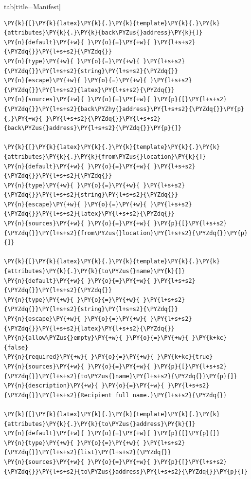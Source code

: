 \documentclass[a4paper,twoside]{article}
\begin{document}
\begin{tsdiv}{tab}[title=Manifest]
\begin{tscode}[lang=toml, engine=pygments]
\begin{Verbatim}[commandchars=\\\{\},breaklines, breakanywhere, commandchars=\\\{\}]
\PY{k}{[}\PY{k}{latex}\PY{k}{.}\PY{k}{template}\PY{k}{.}\PY{k}{attributes}\PY{k}{.}\PY{k}{back\PYZus{}address}\PY{k}{]}
\PY{n}{default}\PY{+w}{ }\PY{o}{=}\PY{+w}{ }\PY{l+s+s2}{\PYZdq{}}\PY{l+s+s2}{\PYZdq{}}
\PY{n}{type}\PY{+w}{ }\PY{o}{=}\PY{+w}{ }\PY{l+s+s2}{\PYZdq{}}\PY{l+s+s2}{string}\PY{l+s+s2}{\PYZdq{}}
\PY{n}{escape}\PY{+w}{ }\PY{o}{=}\PY{+w}{ }\PY{l+s+s2}{\PYZdq{}}\PY{l+s+s2}{latex}\PY{l+s+s2}{\PYZdq{}}
\PY{n}{sources}\PY{+w}{ }\PY{o}{=}\PY{+w}{ }\PY{p}{[}\PY{l+s+s2}{\PYZdq{}}\PY{l+s+s2}{back\PYZhy{}address}\PY{l+s+s2}{\PYZdq{}}\PY{p}{,}\PY{+w}{ }\PY{l+s+s2}{\PYZdq{}}\PY{l+s+s2}{back\PYZus{}address}\PY{l+s+s2}{\PYZdq{}}\PY{p}{]}

\PY{k}{[}\PY{k}{latex}\PY{k}{.}\PY{k}{template}\PY{k}{.}\PY{k}{attributes}\PY{k}{.}\PY{k}{from\PYZus{}location}\PY{k}{]}
\PY{n}{default}\PY{+w}{ }\PY{o}{=}\PY{+w}{ }\PY{l+s+s2}{\PYZdq{}}\PY{l+s+s2}{\PYZdq{}}
\PY{n}{type}\PY{+w}{ }\PY{o}{=}\PY{+w}{ }\PY{l+s+s2}{\PYZdq{}}\PY{l+s+s2}{string}\PY{l+s+s2}{\PYZdq{}}
\PY{n}{escape}\PY{+w}{ }\PY{o}{=}\PY{+w}{ }\PY{l+s+s2}{\PYZdq{}}\PY{l+s+s2}{latex}\PY{l+s+s2}{\PYZdq{}}
\PY{n}{sources}\PY{+w}{ }\PY{o}{=}\PY{+w}{ }\PY{p}{[}\PY{l+s+s2}{\PYZdq{}}\PY{l+s+s2}{from\PYZus{}location}\PY{l+s+s2}{\PYZdq{}}\PY{p}{]}

\PY{k}{[}\PY{k}{latex}\PY{k}{.}\PY{k}{template}\PY{k}{.}\PY{k}{attributes}\PY{k}{.}\PY{k}{to\PYZus{}name}\PY{k}{]}
\PY{n}{default}\PY{+w}{ }\PY{o}{=}\PY{+w}{ }\PY{l+s+s2}{\PYZdq{}}\PY{l+s+s2}{\PYZdq{}}
\PY{n}{type}\PY{+w}{ }\PY{o}{=}\PY{+w}{ }\PY{l+s+s2}{\PYZdq{}}\PY{l+s+s2}{string}\PY{l+s+s2}{\PYZdq{}}
\PY{n}{escape}\PY{+w}{ }\PY{o}{=}\PY{+w}{ }\PY{l+s+s2}{\PYZdq{}}\PY{l+s+s2}{latex}\PY{l+s+s2}{\PYZdq{}}
\PY{n}{allow\PYZus{}empty}\PY{+w}{ }\PY{o}{=}\PY{+w}{ }\PY{k+kc}{false}
\PY{n}{required}\PY{+w}{ }\PY{o}{=}\PY{+w}{ }\PY{k+kc}{true}
\PY{n}{sources}\PY{+w}{ }\PY{o}{=}\PY{+w}{ }\PY{p}{[}\PY{l+s+s2}{\PYZdq{}}\PY{l+s+s2}{to\PYZus{}name}\PY{l+s+s2}{\PYZdq{}}\PY{p}{]}
\PY{n}{description}\PY{+w}{ }\PY{o}{=}\PY{+w}{ }\PY{l+s+s2}{\PYZdq{}}\PY{l+s+s2}{Recipient full name.}\PY{l+s+s2}{\PYZdq{}}

\PY{k}{[}\PY{k}{latex}\PY{k}{.}\PY{k}{template}\PY{k}{.}\PY{k}{attributes}\PY{k}{.}\PY{k}{to\PYZus{}address}\PY{k}{]}
\PY{n}{default}\PY{+w}{ }\PY{o}{=}\PY{+w}{ }\PY{p}{[}\PY{p}{]}
\PY{n}{type}\PY{+w}{ }\PY{o}{=}\PY{+w}{ }\PY{l+s+s2}{\PYZdq{}}\PY{l+s+s2}{list}\PY{l+s+s2}{\PYZdq{}}
\PY{n}{sources}\PY{+w}{ }\PY{o}{=}\PY{+w}{ }\PY{p}{[}\PY{l+s+s2}{\PYZdq{}}\PY{l+s+s2}{to\PYZus{}address}\PY{l+s+s2}{\PYZdq{}}\PY{p}{]}


\end{Verbatim}
\end{tscode}
\end{tsdiv}
\end{document}
